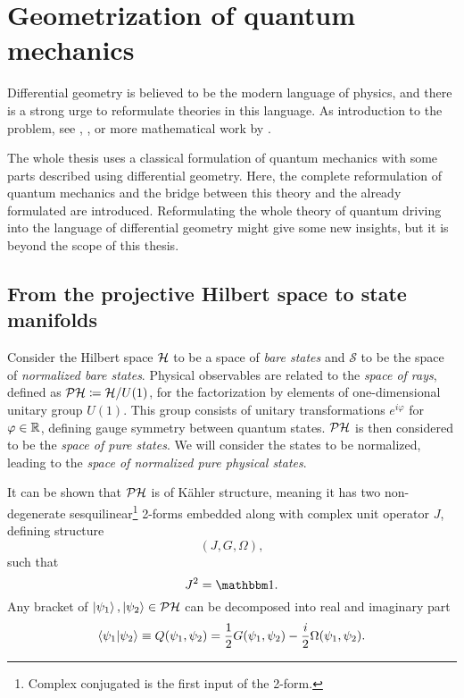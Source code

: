 \chapter{Geometrization of quantum mechanics}
\label{appendixGEOM}
Differential geometry is believed to be the modern language of physics, and there is a strong urge to reformulate theories in this language. As introduction to the problem, see \citet{ashtekar_geometrical_1997}, \cite{ashtekar_geometry_1995}, or more mathematical work by \citet{molitor_exponential_2013}.

The whole thesis uses a classical formulation of quantum mechanics with some parts described using differential geometry. Here, the complete reformulation of quantum mechanics and the bridge between this theory and the already formulated are introduced. Reformulating the whole theory of quantum driving into the language of differential geometry might give some new insights, but it is beyond the scope of this thesis.


\section{From the projective Hilbert space to state manifolds}


Consider the Hilbert space $\mathcal{H}$ to be a space of \emph{bare states} and $\mathcal{S}$ to be the space of \emph{normalized bare states}. Physical observables are related to the \emph{space of rays}, defined as $\mathcal{PH}\coloneqq \mathcal{H}/U(1)$, for the factorization by elements of one-dimensional unitary group $U(1)$. This group consists of unitary transformations $e^{i\varphi}$ for $\varphi\in\mathbb{R}$, defining gauge symmetry between quantum states. $\mathcal{PH}$ is then considered to be the \emph{space of pure states}. We will consider the states to be normalized, leading to the \emph{space of normalized pure physical states}. 

It can be shown that $\mathcal{PH}$ is of K\"ahler structure, meaning it has two non-degenerate sesquilinear\footnote{Complex conjugated is the first input of the 2-form.} 2-forms embedded along with complex unit operator $J$, defining structure
$$(J, G, \Omega),$$
such that
\begin{equation}
    J^2=\Id.
\end{equation}
Any bracket of $\ket{\psi_1},\ket{\psi_2}\in \mathcal{PH}$ can be decomposed into real and imaginary part\cite{ashtekar_geometrical_1997}
\begin{equation}
    \braket{\psi_1|\psi_2}\equiv Q(\psi_1,\psi_2)=\frac{1}{2}G(\psi_1,\psi_2)-\frac{i}{2}\Omega(\psi_1,\psi_2).
\end{equation}

